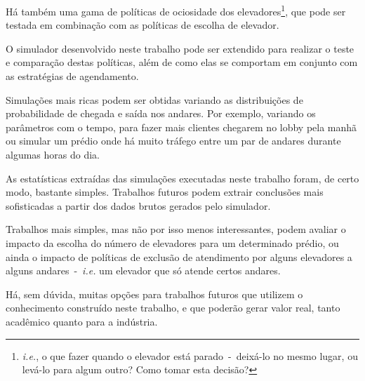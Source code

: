 Há também uma gama de políticas de ociosidade dos
elevadores\footnote{\textit{i.e.}, o que fazer quando o elevador está
  parado~-~deixá-lo no mesmo lugar, ou levá-lo para algum outro? Como tomar esta
decisão?}, que pode ser testada em combinação com as políticas de escolha de elevador.

O simulador desenvolvido neste trabalho pode ser extendido para realizar o teste
e comparação destas políticas, além de como elas se comportam em conjunto com as
estratégias de agendamento.

Simulações mais ricas podem ser obtidas variando as distribuições de
probabilidade de chegada e saída nos andares. Por exemplo, variando os
parâmetros com o tempo, para fazer mais clientes chegarem no lobby pela manhã ou
simular um prédio onde há muito tráfego entre um par de andares durante algumas
horas do dia.

As estatísticas extraídas das simulações executadas neste trabalho foram, de
certo modo, bastante simples. Trabalhos futuros podem extrair conclusões mais
sofisticadas a partir dos dados brutos gerados pelo simulador.

Trabalhos mais simples, mas não por isso menos interessantes, podem avaliar o
impacto da escolha do número de elevadores para um determinado prédio, ou ainda
o impacto de políticas de exclusão de atendimento por alguns elevadores a alguns
andares~-~\textit{i.e.} um elevador que só atende certos andares.

Há, sem dúvida, muitas opções para trabalhos futuros que utilizem o conhecimento
construído neste trabalho, e que poderão gerar valor real, tanto acadêmico
quanto para a indústria.
